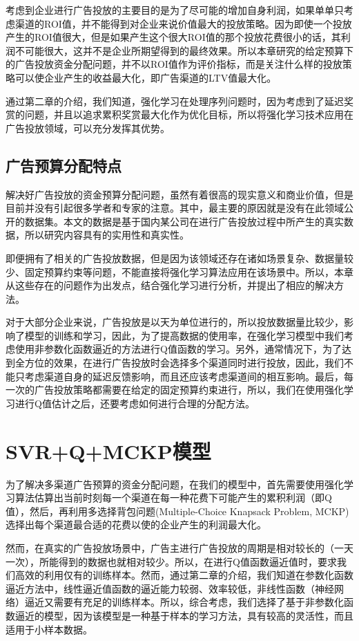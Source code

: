 考虑到企业进行广告投放的主要目的是为了尽可能的增加自身利润，如果单单只考虑渠道的ROI值，并不能得到对企业来说价值最大的投放策略。因为即使一个投放产生的ROI值很大，但是如果产生这个很大ROI值的那个投放花费很小的话，其利润不可能很大，这并不是企业所期望得到的最终效果。所以本章研究的给定预算下的广告投放资金分配问题，并不以ROI值作为评价指标，而是关注什么样的投放策略可以使企业产生的收益最大化，即广告渠道的LTV值最大化。

通过第二章的介绍，我们知道，强化学习在处理序列问题时，因为考虑到了延迟奖赏的问题，并且以追求累积奖赏最大化作为优化目标，所以将强化学习技术应用在广告投放领域，可以充分发挥其优势。

\subsection{广告预算分配特点}
解决好广告投放的资金预算分配问题，虽然有着很高的现实意义和商业价值，但是目前并没有引起很多学者和专家的注意。其中，最主要的原因就是没有在此领域公开的数据集。本文的数据是基于国内某公司在进行广告投放过程中所产生的真实数据，所以研究内容具有的实用性和真实性。

即便拥有了相关的广告投放数据，但是因为该领域还存在诸如场景复杂、数据量较少、固定预算约束等问题，不能直接将强化学习算法应用在该场景中。所以，本章从这些存在的问题作为出发点，结合强化学习进行分析，并提出了相应的解决方法。

对于大部分企业来说，广告投放是以天为单位进行的，所以投放数据量比较少，影响了模型的训练和学习，因此，为了提高数据的使用率，在强化学习模型中我们考虑使用非参数化函数逼近的方法进行Q值函数的学习。另外，通常情况下，为了达到全方位的效果，在进行广告投放时会选择多个渠道同时进行投放，因此，我们不能只考虑渠道自身的延迟反馈影响，而且还应该考虑渠道间的相互影响。最后，每一次的广告投放策略都需要在给定的固定预算约束进行，所以，我们在使用强化学习进行Q值估计之后，还要考虑如何进行合理的分配方法。

\section{SVR+Q+MCKP模型}
为了解决多渠道广告预算的资金分配问题，在我们的模型中，首先需要使用强化学习算法估算出当前时刻每一个渠道在每一种花费下可能产生的累积利润（即Q值），然后，再利用多选择背包问题(Multiple-Choice Knapsack Problem, MCKP)选择出每个渠道最合适的花费以使的企业产生的利润最大化。

然而，在真实的广告投放场景中，广告主进行广告投放的周期是相对较长的（一天一次），所能得到的数据也就相对较少。所以，在进行Q值函数逼近值时，要求我们高效的利用仅有的训练样本。然而，通过第二章的介绍，我们知道在参数化函数逼近方法中，线性逼近值函数的逼近能力较弱、效率较低，非线性函数（神经网络）逼近又需要有充足的训练样本。所以，综合考虑，我们选择了基于非参数化函数逼近的模型，因为该模型是一种基于样本的学习方法，具有较高的灵活性，而且适用于小样本数据。

